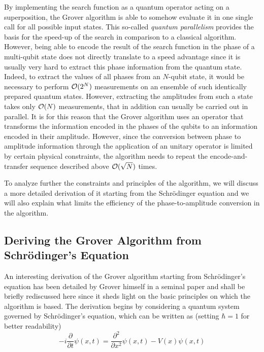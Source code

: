By implementing the search function as a quantum operator acting on a superposition, the Grover algorithm is able to somehow evaluate it in one single call for all possible input states. This so-called {\it quantum parallelism} provides the basis for the speed-up of the search in comparison to a classical algorithm. However, being able to encode the result of the search function in the phase of a multi-qubit state does not directly translate to a speed advantage since it is usually very hard to extract this phase information from the quantum state. Indeed, to extract the values of all phases from an $N$-qubit state, it would be necessary to perform $\begin{mathcal}O(2^N)\end{mathcal}$ measurements on an ensemble of such identically prepared quantum states. However, extracting the amplitudes from such a state takes only $\begin{mathcal}O\end{mathcal}(N)$ measurements, that in addition can usually be carried out in parallel. It is for this reason that the Grover algorithm uses an operator that transforms the information encoded in the phases of the qubits to an information encoded in their amplitude. However, since the conversion between phase to amplitude information through the application of an unitary operator is limited by certain physical constraints, the algorithm needs to repeat the encode-and-transfer sequence described above $\begin{mathcal}O(\sqrt{N})\end{mathcal}$ times. \cite{lloyd_quantum_1999,meyer_sophisticated_2000,lanyon_experimental_2008,ahn_information_2000,ding_review_2007,linden_good_2001,braunstein_speed-up_2002}

\smallskip

To analyze further the constraints and principles of the algorithm, we will discuss a more detailed derivation of it starting from the Schrödinger equation and we will also explain what limits the efficiency of the phase-to-amplitude conversion in the algorithm.

\subsection{Deriving the Grover Algorithm from Schrödinger's Equation}


An interesting derivation of the Grover algorithm starting from Schrödinger's equation has been detailed by Grover himself in a seminal paper \citep{grover_schrodingers_2001} and shall be briefly rediscussed here since it sheds light on the basic principles on which the algorithm is based. The derivation begins by considering a quantum system governed by Schrödinger's equation, which can be written as (setting $\hbar = 1$ for better readability)
%
\begin{equation}
-i\frac{\partial}{\partial t}\psi(x,t) = \frac{\partial^2}{\partial x^2}\psi(x,t)-V(x)\psi(x,t) \label{eq:grover_derivation}
\end{equation}
%

